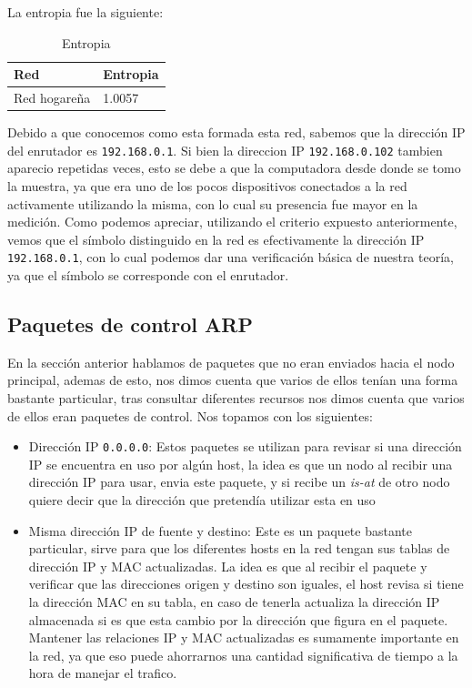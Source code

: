 La entropia fue la siguiente:

\begin{table}[H]
\centering
\caption{Entropia}
\label{my-label}
\begin{tabular}{ll}
\hline
Red         & Entropia \\ \hline
Red hogareña & 1.0057   \\
\end{tabular}
\end{table}

Debido a que conocemos como esta formada esta red, sabemos que la dirección IP del enrutador es \texttt{192.168.0.1}. Si bien la direccion IP \texttt{192.168.0.102} tambien aparecio repetidas veces, esto se debe a que la computadora desde donde se tomo la muestra, ya que era uno de los pocos dispositivos conectados a la red activamente utilizando la misma, con lo cual su presencia fue mayor en la medición. Como podemos apreciar, utilizando el criterio expuesto anteriormente, vemos que el símbolo distinguido en la red es efectivamente la dirección IP \texttt{192.168.0.1}, con lo cual podemos dar una verificación básica de nuestra teoría, ya que el símbolo se corresponde con el enrutador.

\subsection{Paquetes de control ARP}

En la sección anterior hablamos de paquetes que no eran enviados hacia el nodo principal, ademas de esto, nos dimos cuenta que varios de ellos tenían una forma bastante particular, tras consultar diferentes recursos nos dimos cuenta que varios de ellos eran paquetes de control. Nos topamos con los siguientes:

\begin{itemize}
	\item Dirección IP \texttt{0.0.0.0}: Estos paquetes se utilizan para revisar si una dirección IP se encuentra en uso por algún host, la idea es que un nodo al recibir una dirección IP para usar, envia este paquete, y si recibe un \textit{is-at} de otro nodo quiere decir que la dirección que pretendía utilizar esta en uso
	\item Misma dirección IP de fuente y destino: Este es un paquete bastante particular, sirve para que los diferentes hosts en la red tengan sus tablas de dirección IP y MAC actualizadas. La idea es que al recibir el paquete y verificar que las direcciones origen y destino son iguales, el host revisa si tiene la dirección MAC en su tabla, en caso de tenerla actualiza la dirección IP almacenada si es que esta cambio por la dirección que figura en el paquete. Mantener las relaciones IP y MAC actualizadas es sumamente importante en la red, ya que eso puede ahorrarnos una cantidad significativa de tiempo a la hora de manejar el trafico.
\end{itemize}


